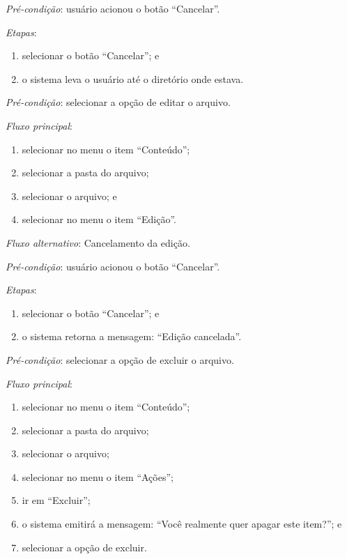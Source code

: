 \noindent \textit{Pré-condição}:  usuário acionou o botão ``Cancelar''.

\noindent \textit{Etapas}:

\begin{enumerate}
    \item selecionar o botão ``Cancelar''; e
    \item o sistema leva o usuário até o diretório onde estava.
\end{enumerate}



\vspace{0.7cm}

\noindent \textit{Pré-condição}: selecionar a opção de editar o arquivo.

\noindent \textit{Fluxo principal}:

\begin{enumerate}
    \item selecionar no menu o item ``Conteúdo'';
    \item selecionar a pasta do arquivo;
    \item selecionar o arquivo; e
    \item selecionar no menu o item ``Edição''.
\end{enumerate}

\noindent \textit{Fluxo alternativo}: Cancelamento da edição.

\noindent \textit{Pré-condição}: usuário acionou o botão ``Cancelar''.

\noindent \textit{Etapas}:

\begin{enumerate}
    \item selecionar o botão ``Cancelar''; e
    \item o sistema retorna a mensagem: ``Edição cancelada''.
\end{enumerate}


\vspace{0.7cm}

\noindent \textit{Pré-condição}: selecionar a opção de excluir o arquivo.

\noindent \textit{Fluxo principal}:

\begin{enumerate}
    \item selecionar no menu o item ``Conteúdo'';
    \item selecionar a pasta do arquivo;
    \item selecionar o arquivo;
    \item selecionar no menu o item ``Ações'';
    \item ir em ``Excluir'';
    \item o sistema emitirá a mensagem: ``Você realmente quer apagar este item?''; e
    \item selecionar a opção de excluir.
\end{enumerate}

